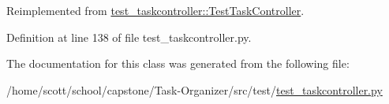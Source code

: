 \hypertarget{classtest__taskcontroller_1_1TestTaskControllerFileStorage_a4e8286cf16ac1c8751a710a36785aa69}{
\subsubsection[{title}]{}}
\label{classtest__taskcontroller_1_1TestTaskControllerFileStorage_a4e8286cf16ac1c8751a710a36785aa69}


\-Reimplemented from \hyperlink{classtest__taskcontroller_1_1TestTaskController_a450431cde03f14169cd5ac04db704ab6}{test\-\_\-taskcontroller\-::\-Test\-Task\-Controller}.



\-Definition at line 138 of file test\-\_\-taskcontroller.\-py.



\-The documentation for this class was generated from the following file\-:\begin{DoxyCompactItemize}
\item 
/home/scott/school/capstone/\-Task-\/\-Organizer/src/test/\hyperlink{test__taskcontroller_8py}{test\-\_\-taskcontroller.\-py}\end{DoxyCompactItemize}
